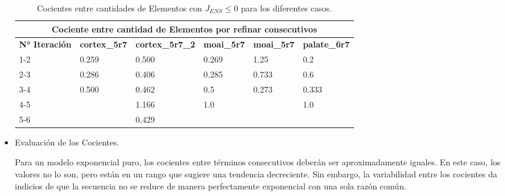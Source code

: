 \begin{itemize}
	\begin{table}[!ht]
	\centering
	\begin{tabular}{|llllll|}
	\hline
	\multicolumn{6}{|c|}{ Cociente entre cantidad de Elementos por refinar consecutivos}                                                                                                                                                                           \\ \hline
	\multicolumn{1}{|l|}{\textbf{N° Iteración}} & \multicolumn{1}{l|}{\textbf{cortex\_5r7}} & \multicolumn{1}{l|}{\textbf{cortex\_5r7\_2}} & \multicolumn{1}{l|}{\textbf{moai\_5r7}} & \multicolumn{1}{l|}{\textbf{moai\_5r7}} & \textbf{palate\_6r7} \\ \hline
	\multicolumn{1}{|l|}{1-2}                   & \multicolumn{1}{l|}{0.259}          & \multicolumn{1}{l|}{0.500}             & \multicolumn{1}{l|}{0.269}         & \multicolumn{1}{l|}{1.25}         & 0.2             \\ \hline
	\multicolumn{1}{|l|}{2-3}                   & \multicolumn{1}{l|}{0.286}            & \multicolumn{1}{l|}{0.406}             & \multicolumn{1}{l|}{0.285}          & \multicolumn{1}{l|}{0.733}        & 0.6              \\ \hline
	\multicolumn{1}{|l|}{3-4}                   & \multicolumn{1}{l|}{0.500}            & \multicolumn{1}{l|}{0.462}              & \multicolumn{1}{l|}{0.5}            & \multicolumn{1}{l|}{0.273}         & 0.333            \\ \hline
	\multicolumn{1}{|l|}{4-5}                   & \multicolumn{1}{l|}{}                     & \multicolumn{1}{l|}{1.166}               & \multicolumn{1}{l|}{1.0}            & \multicolumn{1}{l|}{}                   & 1.0              \\ \hline
	\multicolumn{1}{|l|}{5-6}                   & \multicolumn{1}{l|}{}                     & \multicolumn{1}{l|}{0.429}               & \multicolumn{1}{l|}{}                   & \multicolumn{1}{l|}{}                   &                      \\ \hline
	\end{tabular}
	\caption{Cocientes entre cantidades de Elementos con $J_{ENS} \leq 0$ para los diferentes casos. }
	\label{table:co_els_ref}
	\end{table}


    \item Evaluación de los Cocientes.

    Para un modelo exponencial puro, los cocientes entre términos consecutivos deberán ser aproximadamente iguales. En este caso, los valores no lo son, pero están en un rango que sugiere una tendencia decreciente. Sin embargo, la variabilidad entre los cocientes da indicios de que la secuencia no se reduce de manera perfectamente exponencial con una sola razón común.


\end{itemize}
